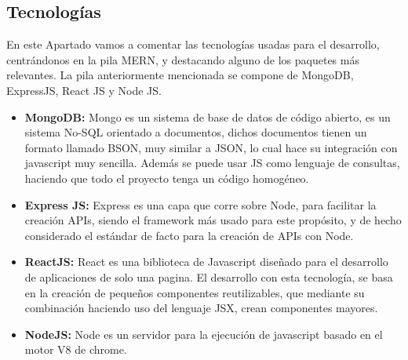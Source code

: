 \subsection {Tecnologías}
En este Apartado vamos a comentar las tecnologías usadas para el desarrollo, centrándonos en la pila MERN, y destacando alguno de los paquetes más relevantes. La pila anteriormente mencionada se compone de MongoDB, ExpressJS, React JS y Node JS.
\begin{itemize}
  \item \textbf{MongoDB:} Mongo es un sistema de base de datos de código abierto, es un sistema No-SQL orientado a documentos, dichos documentos tienen un formato llamado BSON, muy similar a JSON, lo cual hace su integración con javascript muy sencilla. Además se puede usar JS como lenguaje de consultas, haciendo que todo el proyecto tenga un código homogéneo.
  
  \item \textbf{Express JS:} Express es una capa que corre sobre Node, para facilitar la creación APIs, siendo el framework más usado para este propósito, y de hecho considerado el estándar de facto para la creación de APIs con Node.
  
  \item \textbf{ReactJS:} React es una biblioteca de Javascript diseñado para el desarrollo de aplicaciones de solo una pagina. El desarrollo con esta tecnología, se basa en la creación de pequeños componentes reutilizables, que mediante su combinación haciendo uso del lenguaje JSX, crean componentes mayores.
  
  \item \textbf{NodeJS:} Node es un servidor para la ejecución de javascript basado en el motor V8 de chrome. 
\end{itemize}

